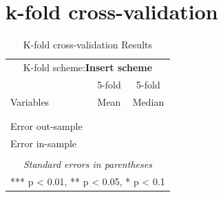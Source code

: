 \documentclass{article}
\begin{document}
\section{k-fold cross-validation}

\begin{table}[!h]
  \centering
  \caption{K-fold cross-validation Results}
    \begin{tabular}{l c c}
    \hline
    \multicolumn{3}{c}{K-fold scheme:\textbf{Insert scheme}} \\
                 & 5-fold  & 5-fold \\
    Variables    & Mean             & Median          \\
    \hline
    \hline
                 &                  &                  \\
                 &                  &                  \\
    \hline

    Error out-sample &     &   \\
    Error in-sample  &     &   \\
                     &     &   \\
    \hline
    \hline
    \multicolumn{3}{c}{\textit{Standard errors in parentheses}} \\
    \multicolumn{3}{c}{*** p < 0.01, ** p < 0.05, * p < 0.1} \\
    \hline
    \end{tabular}
  \label{tab:addlabel}
\end{table}
\end{document}
